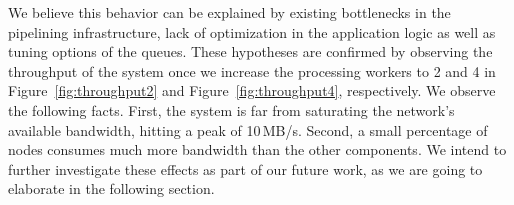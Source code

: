 We believe this behavior can be explained by existing bottlenecks in the pipelining infrastructure, lack of optimization in the application logic as well as tuning options of the \zmq queues.
These hypotheses are confirmed by observing the throughput of the system once we increase the processing workers to 2 and 4 in Figure~\ref{fig:throughput2} and Figure~\ref{fig:throughput4}, respectively.
We observe the following facts.
First, the system is far from saturating the network's available bandwidth, hitting a peak of 10\,MB/s.
Second, a small percentage of nodes consumes much more bandwidth than the other components.
We intend to further investigate these effects as part of our future work, as we are going to elaborate in the following section.


